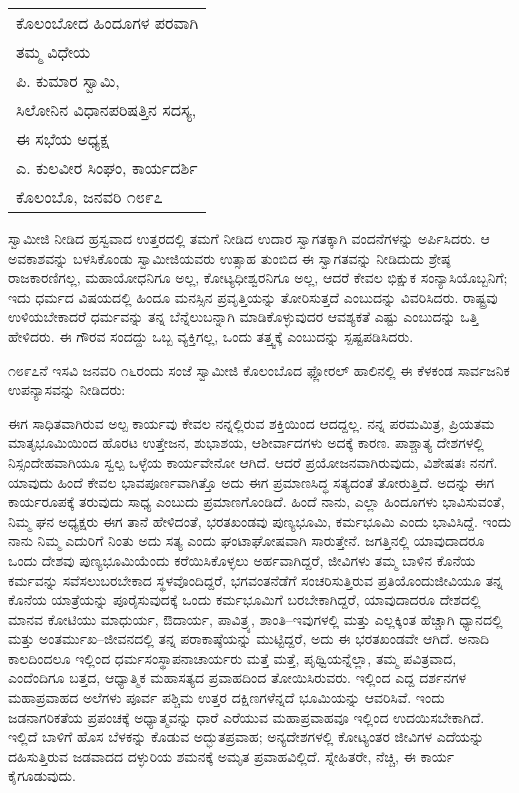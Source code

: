 \vskip   4pt

\begin{longtable}[r]{@{}l@{}}
ಕೊಲಂಬೋದ ಹಿಂದೂಗಳ ಪರವಾಗಿ \\
ತಮ್ಮ ವಿಧೇಯ \\
ಪಿ. ಕುಮಾರ ಸ್ವಾಮಿ, \\
ಸಿಲೋನಿನ ವಿಧಾನಪರಿಷತ್ತಿನ ಸದಸ್ಯ, \\
ಈ ಸಭೆಯ ಅಧ್ಯಕ್ಷ \\
ಎ. ಕುಲವೀರ ಸಿಂಘಂ, ಕಾರ್ಯದರ್ಶಿ \\
ಕೊಲಂಬೊ, ಜನವರಿ ೧೮೯೭ \\
\end{longtable}

\vskip   4pt

ಸ್ವಾಮೀಜಿ ನೀಡಿದ ಹ್ರಸ್ವವಾದ ಉತ್ತರದಲ್ಲಿ ತಮಗೆ ನೀಡಿದ ಉದಾರ ಸ್ವಾಗತಕ್ಕಾಗಿ ವಂದನೆಗಳನ್ನು ಅರ್ಪಿಸಿದರು. ಆ ಅವಕಾಶವನ್ನು ಬಳಸಿಕೊಂಡು ಸ್ವಾಮೀಜಿಯವರು ಉತ್ಸಾಹ ತುಂಬಿದ ಈ ಸ್ವಾಗತವನ್ನು ನೀಡಿದುದು ಶ್ರೇಷ್ಠ ರಾಜಕಾರಣಿಗಲ್ಲ, ಮಹಾಯೋಧನಿಗೂ ಅಲ್ಲ, ಕೋಟ್ಯಧೀಶ್ವರನಿಗೂ ಅಲ್ಲ, ಆದರೆ ಕೇವಲ ಭಿಕ್ಷುಕ ಸಂನ್ಯಾಸಿಯೊಬ್ಬನಿಗೆ; ಇದು ಧರ್ಮದ ವಿಷಯದಲ್ಲಿ ಹಿಂದೂ ಮನಸ್ಸಿನ ಪ್ರವೃತ್ತಿಯನ್ನು ತೋರಿಸುತ್ತದೆ ಎಂಬುದನ್ನು ವಿವರಿಸಿದರು. ರಾಷ್ಟ್ರವು ಉಳಿಯಬೇಕಾದರೆ ಧರ್ಮವನ್ನು ತನ್ನ ಬೆನ್ನೆಲುಬನ್ನಾಗಿ ಮಾಡಿಕೊಳ್ಳುವುದರ ಆವಶ್ಯಕತೆ ಎಷ್ಟು ಎಂಬುದನ್ನು ಒತ್ತಿ ಹೇಳಿದರು. ಈ ಗೌರವ ಸಂದದ್ದು ಒಬ್ಬ ವ್ಯಕ್ತಿಗಲ್ಲ, ಒಂದು ತತ್ತ್ವಕ್ಕೆ ಎಂಬುದನ್ನು ಸ್ಪಷ್ಟಪಡಿಸಿದರು.

\vskip   4pt

೧೮೯೭ನೆ ಇಸವಿ ಜನವರಿ ೧೬ರಂದು ಸಂಜೆ ಸ್ವಾಮೀಜಿ ಕೊಲಂಬೊದ ಫ್ಲೋರಲ್​ ಹಾಲಿನಲ್ಲಿ ಈ ಕೆಳಕಂಡ ಸಾರ್ವಜನಿಕ ಉಪನ್ಯಾಸವನ್ನು ನೀಡಿದರು:

\newpage

ಈಗ ಸಾಧಿತವಾಗಿರುವ ಅಲ್ಪ ಕಾರ್ಯವು ಕೇವಲ ನನ್ನಲ್ಲಿರುವ ಶಕ್ತಿಯಿಂದ ಆದದ್ದಲ್ಲ. ನನ್ನ ಪರಮಮಿತ್ರ, ಪ್ರಿಯತಮ ಮಾತೃಭೂಮಿಯಿಂದ ಹೊರಟ ಉತ್ತೇಜನ, ಶುಭಾಶಯ, ಆಶೀರ್ವಾದಗಳು ಅದಕ್ಕೆ ಕಾರಣ. ಪಾಶ್ಚಾತ್ಯ ದೇಶಗಳಲ್ಲಿ ನಿಸ್ಸಂದೇಹವಾಗಿಯೂ ಸ್ವಲ್ಪ ಒಳ್ಳೆಯ ಕಾರ್ಯವೇನೋ ಆಗಿದೆ. ಆದರೆ ಪ್ರಯೋಜನವಾಗಿರುವುದು, ವಿಶೇಷತಃ ನನಗೆ. ಯಾವುದು ಹಿಂದೆ ಕೇವಲ ಭಾವಪೂರ್ಣವಾಗಿತ್ತೊ ಅದು ಈಗ ಪ್ರಮಾಣಸಿದ್ಧ ಸತ್ಯದಂತೆ ತೋರುತ್ತಿದೆ. ಅದನ್ನು ಈಗ ಕಾರ್ಯರೂಪಕ್ಕೆ ತರುವುದು ಸಾಧ್ಯ ಎಂಬುದು ಪ್ರಮಾಣಗೊಂಡಿದೆ. ಹಿಂದೆ ನಾನು, ಎಲ್ಲಾ ಹಿಂದೂಗಳು ಭಾವಿಸುವಂತೆ, ನಿಮ್ಮ ಘನ ಅಧ್ಯಕ್ಷರು ಈಗ ತಾನೆ ಹೇಳಿದಂತೆ, ಭರತಖಂಡವು ಪುಣ್ಯಭೂಮಿ, ಕರ್ಮಭೂಮಿ ಎಂದು ಭಾವಿಸಿದ್ದೆ. ಇಂದು ನಾನು ನಿಮ್ಮ ಎದುರಿಗೆ ನಿಂತು ಅದು ಸತ್ಯ ಎಂದು ಘಂಟಾಘೋಷವಾಗಿ ಸಾರುತ್ತೇನೆ. ಜಗತ್ತಿನಲ್ಲಿ ಯಾವುದಾದರೂ ಒಂದು ದೇಶವು ಪುಣ್ಯಭೂಮಿಯೆಂದು ಕರೆಯಿಸಿಕೊಳ್ಳಲು ಅರ್ಹವಾಗಿದ್ದರೆ, ಜೀವಿಗಳು ತಮ್ಮ ಬಾಳಿನ ಕೊನೆಯ ಕರ್ಮವನ್ನು ಸವೆಸಲು\break ಬರಬೇಕಾದ ಸ್ಥಳವೊಂದಿದ್ದರೆ, ಭಗವಂತನೆಡೆಗೆ ಸಂಚರಿಸುತ್ತಿರುವ ಪ್ರತಿಯೊಂದು\break ಜೀವಿಯೂ ತನ್ನ ಕೊನೆಯ ಯಾತ್ರೆಯನ್ನು ಪೂರೈಸುವುದಕ್ಕೆ ಒಂದು ಕರ್ಮಭೂಮಿಗೆ ಬರಬೇಕಾಗಿದ್ದರೆ, ಯಾವುದಾದರೂ ದೇಶದಲ್ಲಿ ಮಾನವ ಕೋಟಿಯು ಮಾಧುರ್ಯ, ಔದಾರ್ಯ, ಪಾವಿತ್ರ್ಯ, ಶಾಂತಿ–ಇವುಗಳಲ್ಲಿ ಮತ್ತು ಎಲ್ಲಕ್ಕಿಂತ ಹೆಚ್ಚಾಗಿ ಧ್ಯಾನದಲ್ಲಿ ಮತ್ತು ಅಂತರ್ಮುಖ–ಜೀವನದಲ್ಲಿ ತನ್ನ ಪರಾಕಾಷ್ಠೆಯನ್ನು ಮುಟ್ಟಿದ್ದರೆ, ಅದು ಈ ಭರತಖಂಡವೇ ಆಗಿದೆ. ಅನಾದಿ ಕಾಲದಿಂದಲೂ ಇಲ್ಲಿಂದ ಧರ್ಮಸಂಸ್ಥಾಪನಾಚಾರ್ಯರು ಮತ್ತೆ ಮತ್ತೆ, ಪೃಥ್ವಿಯನ್ನೆಲ್ಲಾ, ತಮ್ಮ ಪವಿತ್ರವಾದ, ಎಂದೆಂದಿಗೂ ಬತ್ತದ, ಆಧ್ಯಾತ್ಮಿಕ ಮಹಾಸತ್ಯದ ಪ್ರವಾಹದಿಂದ ತೋಯಿಸಿರುವರು. ಇಲ್ಲಿಂದ ಎದ್ದ ದರ್ಶನಗಳ ಮಹಾಪ್ರವಾಹದ ಅಲೆಗಳು ಪೂರ್ವ ಪಶ್ಚಿಮ ಉತ್ತರ ದಕ್ಷಿಣಗಳೆನ್ನದೆ ಭೂಮಿಯನ್ನು ಆವರಿಸಿವೆ. ಇಂದು ಜಡನಾಗರಿಕತೆಯ ಪ್ರಪಂಚಕ್ಕೆ ಅಧ್ಯಾತ್ಮವನ್ನು ಧಾರೆ ಎರೆಯುವ ಮಹಾಪ್ರವಾಹವೂ ಇಲ್ಲಿಂದ ಉದಯಿಸಬೇಕಾಗಿದೆ. ಇಲ್ಲಿದೆ ಬಾಳಿಗೆ ಹೊಸ ಬೆಳಕನ್ನು ಕೊಡುವ ಅದ್ಭುತಪ್ರವಾಹ; ಅನ್ಯದೇಶಗಳಲ್ಲಿ ಕೋಟ್ಯಂತರ ಜೀವಿಗಳ ಎದೆಯನ್ನು ದಹಿಸುತ್ತಿರುವ ಜಡವಾದದ ದಳ್ಳುರಿಯ ಶಮನಕ್ಕೆ ಅಮೃತ ಪ್ರವಾಹವಿಲ್ಲಿದೆ. ಸ್ನೇಹಿತರೇ, ನೆಚ್ಚಿ, ಈ ಕಾರ್ಯ ಕೈಗೂಡುವುದು.

